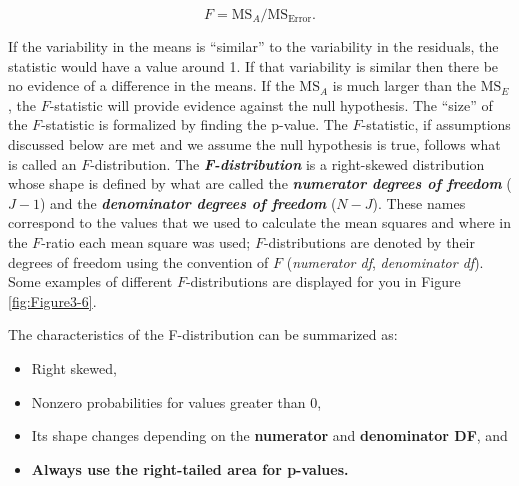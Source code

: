 \documentclass[]{book}
\theoremstyle{definition}
\theoremstyle{definition}
\theoremstyle{remark}
\begin{document}
\[F=\text{MS}_A/\text{MS}_{\text{Error}}.\]

If the variability in the means is ``similar'' to the variability in the
residuals, the statistic would have a value around 1. If that
variability is similar then there be no evidence of a difference in the
means. If the \(\text{MS}_A\) is much larger than the \(\text{MS}_E\),
the \(F\)-statistic will provide evidence against the null hypothesis.
The ``size'' of the \(F\)-statistic is formalized by finding the
p-value. The \(F\)-statistic, if assumptions discussed below are met and
we assume the null hypothesis is true, follows what is called an
\(F\)-distribution. The \textbf{\emph{F-distribution}} is a right-skewed
distribution whose shape is defined by what are called the
\textbf{\emph{numerator degrees of freedom}} (\(J-1\)) and the
\textbf{\emph{denominator degrees of freedom}} (\(N-J\)). These names
correspond to the values that we used to calculate the mean squares and
where in the \(F\)-ratio each mean square was used; \(F\)-distributions
are denoted by their degrees of freedom using the convention of \(F\)
(\emph{numerator df}, \emph{denominator df}). Some examples of different
\(F\)-distributions are displayed for you in Figure \ref{fig:Figure3-6}.

The characteristics of the F-distribution can be summarized as:

\begin{itemize}
\item
  Right skewed,
\item
  Nonzero probabilities for values greater than 0,
\item
  Its shape changes depending on the \textbf{numerator} and
  \textbf{denominator DF}, and
\item
  \textbf{Always use the right-tailed area for p-values.}
\end{itemize}
\end{document}
